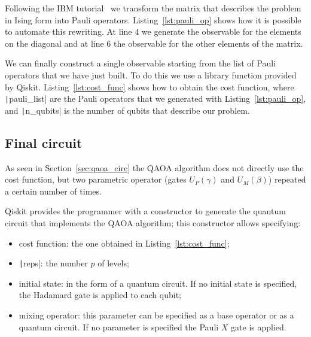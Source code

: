 Following the IBM tutorial~\cite{ibm_qaoa_tutorial} we transform the matrix that describes the problem in Ising form into Pauli operators. Listing~\ref{lst:pauli_op} shows how it is possible to automate this rewriting. At line $4$ we generate the observable for the elements on the diagonal and at line $6$ the observable for the other elements of the matrix.
\begin{listingenv}[h]
	\caption{Genearating Pauli operator}
	\label{lst:pauli_op}
\end{listingenv}

We can finally construct a single observable starting from the list of Pauli operators that we have just built. To do this we use a library function provided by Qiskit. Listing~\ref{lst:cost_func} shows how to obtain the cost function, where \texttt|pauli_list| are the Pauli operators that we generated with Listing~\ref{lst:pauli_op}, and \texttt|n_qubits| is the number of qubits that describe our problem.
\begin{listingenv}[h]
	\caption{Defining cost function}
	\label{lst:cost_func}
\end{listingenv}
\subsection{Final circuit}
As seen in Section~\ref{sec:qaoa_circ} the QAOA algorithm does not directly use the cost function, but two parametric operator (gates $U_P(\gamma)$ and $U_M(\beta)$) repeated a certain number of times. 

Qiskit provides the programmer with a constructor to generate the quantum circuit that implements the QAOA algorithm; this constructor allows specifying:
\begin{itemize}
	\item cost function: the one obtained in Listing~\ref{lst:cost_func};
	\item \texttt|reps|: the number $p$ of levels;
	\item initial state: in the form of a quantum circuit. If no initial state is specified, the Hadamard gate is applied to each qubit;
	\item mixing operator: this parameter can be specified as a base operator or as a quantum circuit. If no parameter is specified the Pauli $X$ gate is applied.
\end{itemize}

